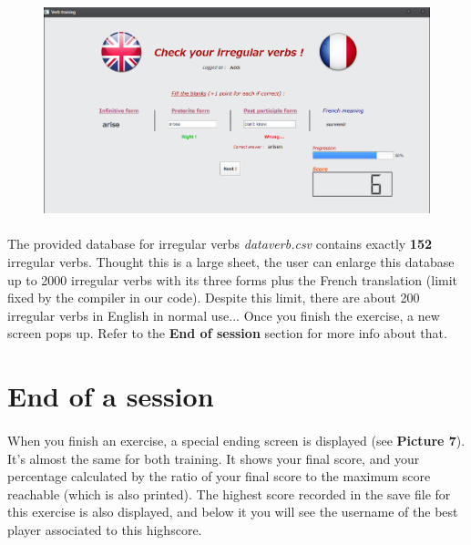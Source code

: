 \documentclass[12pt, a4paper]{report}
\begin{document}
\begin{figure}[H]
    \centering
    \includegraphics[scale=0.55]{images/verbs1.png}
\end{figure}

\paragraph{}The provided database for irregular verbs \textit{dataverb.csv} contains exactly \textbf{152} irregular verbs. Thought this is a large sheet, the user can enlarge this database up to 2000 irregular verbs with its three forms plus the French translation (limit fixed by the compiler in our code). Despite this limit, there are about 200 irregular verbs in English in normal use... Once you finish the exercise, a new screen pops up. Refer to the \textbf{End of session} section for more info about that.

\newpage
\section*{\hspace{0.6cm}End of a session}

\paragraph{}When you finish an exercise, a special ending screen is displayed (see \textbf{Picture 7}). It's almost the same for both training. It shows your final score, and your percentage calculated by the ratio of your final score to the maximum score reachable (which is also printed). The highest score recorded in the save file for this exercise is also displayed, and below it you will see the username of the best player associated to this highscore.
\end{document}
